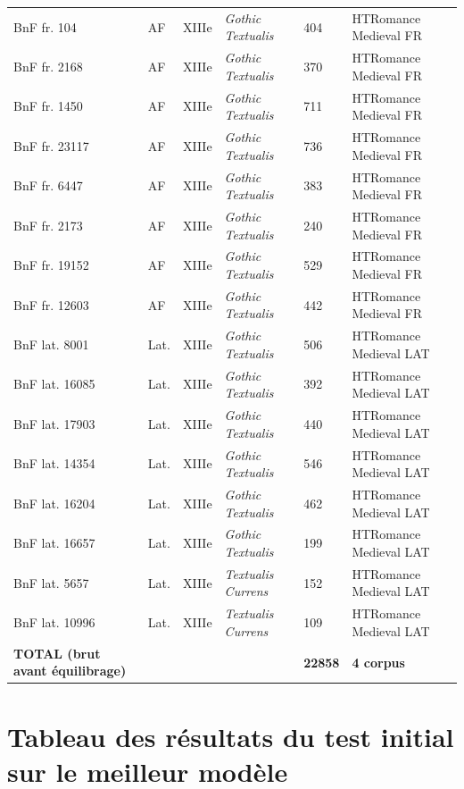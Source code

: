 ﻿\documentclass[twoside,twocolumn,10pt]{article}
\begin{document}
\begin{appendices}
\begin{table}[H]
\begin{tabular}{L{4cm}|C{1cm}|C{1cm}|C{3.5cm}|C{1cm}|C{4.5cm}}
BnF fr. 104 & AF & XIIIe & \textit{Gothic Textualis} & 404 & HTRomance Medieval FR \\
BnF fr. 2168 & AF & XIIIe & \textit{Gothic Textualis} & 370 & HTRomance Medieval FR \\
BnF fr. 1450 & AF & XIIIe & \textit{Gothic Textualis} & 711 & HTRomance Medieval FR \\
BnF fr. 23117 & AF & XIIIe & \textit{Gothic Textualis} & 736 & HTRomance Medieval FR \\
BnF fr. 6447 & AF & XIIIe & \textit{Gothic Textualis} & 383 & HTRomance Medieval FR \\
BnF fr. 2173 & AF & XIIIe & \textit{Gothic Textualis} & 240 & HTRomance Medieval FR \\
BnF fr. 19152 & AF & XIIIe & \textit{Gothic Textualis} & 529 & HTRomance Medieval FR \\
BnF fr. 12603 & AF & XIIIe & \textit{Gothic Textualis} & 442 & HTRomance Medieval FR \\
BnF lat. 8001 & Lat. & XIIIe & \textit{Gothic Textualis} & 506 & HTRomance Medieval LAT \\
BnF lat. 16085 & Lat. & XIIIe & \textit{Gothic Textualis} & 392 & HTRomance Medieval LAT \\
BnF lat. 17903 & Lat. & XIIIe & \textit{Gothic Textualis} & 440 & HTRomance Medieval LAT \\
BnF lat. 14354 & Lat. & XIIIe & \textit{Gothic Textualis} & 546 & HTRomance Medieval LAT \\
BnF lat. 16204 & Lat. & XIIIe & \textit{Gothic Textualis} & 462 & HTRomance Medieval LAT \\
BnF lat. 16657 & Lat. & XIIIe & \textit{Gothic Textualis} & 199 & HTRomance Medieval LAT \\
BnF lat. 5657 & Lat. & XIIIe & \textit{Textualis Currens} & 152 & HTRomance Medieval LAT \\
BnF lat. 10996 & Lat. & XIIIe & \textit{Textualis Currens} & 109 & HTRomance Medieval LAT \\
\midrule
\textbf{TOTAL (brut avant équilibrage)} & & & & \textbf{22858} & \textbf{4 corpus} \\ 
\bottomrule
\end{tabular}
\end{table}

\section{Tableau des résultats du test initial sur le meilleur modèle}
\label{annexe:resultat}


\end{appendices}
\end{document}
